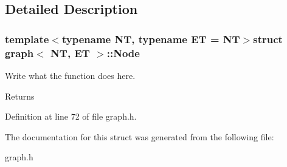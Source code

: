 \subsection{Detailed Description}
\subsubsection*{template$<$typename N\+T, typename E\+T = N\+T$>$struct graph$<$ N\+T, E\+T $>$\+::\+Node}

Write what the function does here. 

\begin{DoxyReturn}{Returns}

\end{DoxyReturn}


Definition at line 72 of file graph.\+h.



The documentation for this struct was generated from the following file\+:\begin{DoxyCompactItemize}
\item 
graph.\+h\end{DoxyCompactItemize}
